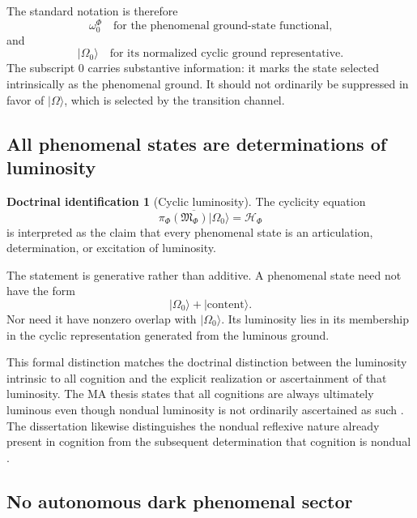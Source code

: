 \documentclass[11pt,reqno]{scrartcl}
\newcommand{\scrHF}{\mathscr H_{\Phi}}
\newcommand{\algF}{\mathfrak M_{\Phi}}
\newcommand{\piF}{\pi_{\Phi}}
\newcommand{\omegaF}{\omega_{0}^{\Phi}}
\newcommand{\ket}[1]{\lvert #1\rangle}
\theoremstyle{plain}
\theoremstyle{definition}
\newtheorem{identification}[identification]{Doctrinal identification}
\theoremstyle{remark}
\begin{document}
The standard notation is therefore
\begin{equation}
  \omegaF
  \quad\text{for the phenomenal ground-state functional,}
\end{equation}
and
\begin{equation}
  \ket{\Omega_0}
  \quad\text{for its normalized cyclic ground representative.}
\end{equation}
The subscript $0$ carries substantive information: it marks the state selected
intrinsically as the phenomenal ground.  It should not ordinarily be
suppressed in favor of $\ket\Omega$, which is selected by the transition
channel.

\subsection{All phenomenal states are determinations of luminosity}

\begin{identification}[Cyclic luminosity]
\label{id:cyclic-luminosity}
The cyclicity equation
\begin{equation}
  \overline{\piF(\algF)\ket{\Omega_0}}=\scrHF
  \label{eq:cyclic-luminosity}
\end{equation}
is interpreted as the claim that every phenomenal state is an articulation,
determination, or excitation of luminosity.
\end{identification}

The statement is generative rather than additive.  A phenomenal state need
not have the form
\begin{equation}
  \ket{\Omega_0}+\ket{\text{content}}.
\end{equation}
Nor need it have nonzero overlap with $\ket{\Omega_0}$.  Its luminosity lies
in its membership in the cyclic representation generated from the luminous
ground.

This formal distinction matches the doctrinal distinction between the
luminosity intrinsic to all cognition and the explicit realization or
ascertainment of that luminosity.  The MA thesis states that all cognitions
are always ultimately luminous even though nondual luminosity is not
ordinarily ascertained as such \cite[pp.~162--163]{Yiannopoulos2012}.  The
dissertation likewise distinguishes the nondual reflexive nature already
present in cognition from the subsequent determination that cognition is
nondual \cite[p.~425]{Yiannopoulos2020}.

\subsection{No autonomous dark phenomenal sector}
\end{document}
